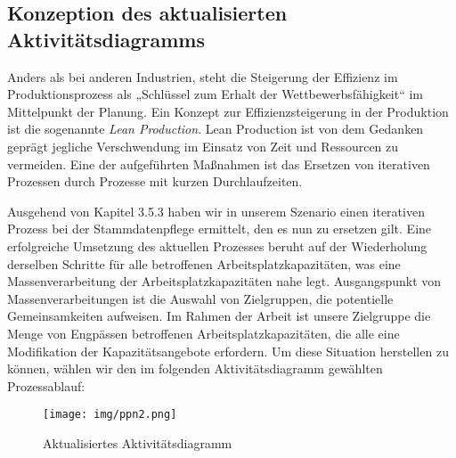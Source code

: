 \subsection{Konzeption des aktualisierten Aktivitätsdiagramms}
Anders als bei anderen Industrien, steht die Steigerung der Effizienz im  Produktionsprozess als „Schlüssel zum Erhalt der Wettbewerbsfähigkeit“ im Mittelpunkt der Planung. Ein Konzept zur Effizienzsteigerung in der Produktion ist die sogenannte \textit{Lean Production}. Lean Production ist von dem Gedanken geprägt jegliche Verschwendung im Einsatz von Zeit und Ressourcen zu vermeiden. Eine der aufgeführten Maßnahmen ist das Ersetzen von iterativen Prozessen durch Prozesse mit kurzen Durchlaufzeiten.
\autocite{Syska.2006}

Ausgehend von Kapitel 3.5.3 haben wir in unserem Szenario einen iterativen Prozess bei der Stammdatenpflege ermittelt, den es nun zu ersetzen gilt. Eine erfolgreiche Umsetzung des aktuellen Prozesses beruht auf der Wiederholung derselben Schritte für alle betroffenen Arbeitsplatzkapazitäten, was eine Massenverarbeitung der Arbeitsplatzkapazitäten nahe legt. Ausgangspunkt von Massenverarbeitungen ist die Auswahl von Zielgruppen, die potentielle Gemeinsamkeiten aufweisen. Im Rahmen der Arbeit ist unsere Zielgruppe die Menge von Engpässen betroffenen Arbeitsplatzkapazitäten, die alle eine Modifikation der Kapazitätsangebote erfordern. Um diese Situation herstellen zu können, wählen wir den im folgenden Aktivitätsdiagramm gewählten Prozessablauf: 

\begin{figure}[H]
	\centering 
	\texttt{[image: img/ppn2.png]}
	\caption[Aktualisiertes Aktivitätsdiagramm]
	{\label{fig:prozess_nachher}Aktualisiertes Aktivitätsdiagramm}
\end{figure}

